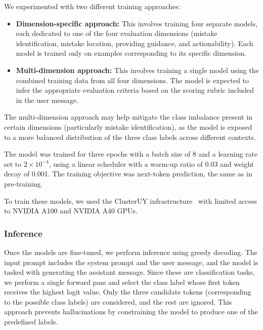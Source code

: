\documentclass[11pt]{article}
\begin{document}
We experimented with two different training approaches:

\begin{itemize}
    \setlength\itemsep{0em}

	\item \textbf{Dimension-specific approach:} This involves training four separate models, each dedicated to one of the four evaluation dimensions (mistake identification, mistake location, providing guidance, and actionability).
    Each model is trained only on examples corresponding to its specific dimension.
	\item \textbf{Multi-dimension approach:} This involves training a single model using the combined training data from all four dimensions.
    The model is expected to infer the appropriate evaluation criteria based on the scoring rubric included in the user message.
\end{itemize}

The multi-dimension approach may help mitigate the class imbalance present in certain dimensions (particularly mistake identification), as the model is exposed to a more balanced distribution of the three class labels across different contexts.

The model was trained for three epochs with a batch size of 8 and a learning rate set to $2 \times 10^{-4}$, using a linear scheduler with a warm-up ratio of 0.03 and weight decay of 0.001.
The training objective was next-token prediction, the same as in pre-training.

To train these models, we used the ClusterUY infrastructure~\cite{clusteruy} with limited access to NVIDIA A100 and NVIDIA A40 GPUs.






\subsubsection{Inference}





Once the models are fine-tuned, we perform inference using greedy decoding.
The input prompt includes the system prompt and the user message, and the model is tasked with generating the assistant message.
Since these are classification tasks, we perform a single forward pass and select the class label whose first token receives the highest logit value.
Only the three candidate tokens (corresponding to the possible class labels) are considered, and the rest are ignored.
This approach prevents hallucinations by constraining the model to produce one of the predefined labels.
\end{document}

